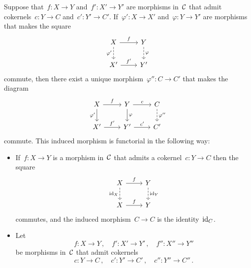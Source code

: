 \begin{remark*}
\begin{enumerate}
      Suppose that~$f \colon X \to Y$ and~$f' \colon X' \to Y'$ are morphisms in~$\mathcal{C}$ that admit cokernels~$c \colon Y \to C$ and~$c' \colon Y' \to C'$.
      If~$\varphi' \colon X \to X'$ and~$\varphi \colon Y \to Y'$ are morphisms that makes the square
      \[
        \begin{tikzcd}
            X
            \arrow{r}[above]{f}
            \arrow[dashed]{d}[left]{\varphi'}
          & Y
            \arrow[dashed]{d}[right]{\varphi}
          \\
            X'
            \arrow{r}[above]{f'}
          & Y'
        \end{tikzcd}
      \]
      commute, then there exist a unique morphism~$\varphi'' \colon C \to C'$ that makes the diagram
      \[
        \begin{tikzcd}
            X
            \arrow{r}[above]{f}
            \arrow{d}[left]{\varphi'}
          & Y
            \arrow{r}[above]{c}
            \arrow{d}[right]{\varphi}
          & C
            \arrow[dashed]{d}[right]{\varphi''}
          \\
            X'
            \arrow{r}[above]{f'}
          & Y'
            \arrow{r}[above]{c'}
          & C'
        \end{tikzcd}
      \]
      commute.
      This induced morphism is functorial in the following way:
      \begin{itemize}
        \item
          If~$f \colon X \to Y$ is a morphism in~$\mathcal{C}$ that admits a cokernel~$c \colon Y \to C$ then the square
          \[
            \begin{tikzcd}
                X
                \arrow{r}[above]{f}
                \arrow[dashed]{d}[left]{\id_X}
              & Y
                \arrow[dashed]{d}[right]{\id_Y}
              \\
                X
                \arrow{r}[above]{f}
              & Y
            \end{tikzcd}
          \]
          commutes, and the induced morphism~$C \to C$ is the identity~$\operatorname{id}_C$.
        \item
          Let
          \[
            f \colon X \to Y \,,
            \quad
            f' \colon X' \to Y' \,,
            \quad
            f'' \colon X'' \to Y''
          \]
          be morphisms in~$\mathcal{C}$ that admit cokernels
          \[
            c \colon Y \to C \,,
            \quad
            c' \colon Y' \to C' \,,
            \quad
            c'' \colon Y'' \to C'' \,.
          \]

\end{itemize}
\end{enumerate}
\end{remark*}
